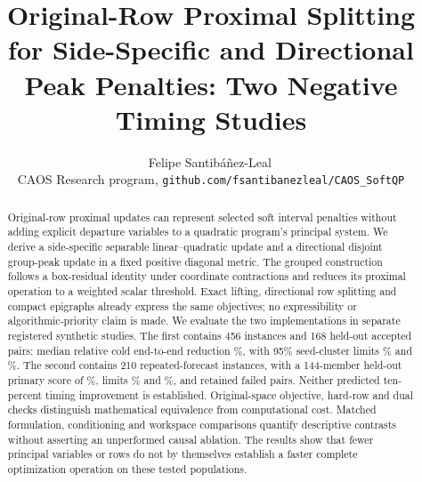 \documentclass[11pt]{article}
\title{Original-Row Proximal Splitting for Side-Specific and Directional Peak Penalties: Two Negative Timing Studies}
\author{Felipe Santib\'a\~nez-Leal\,\orcidlink{0000-0002-0150-3246}\\
\small CAOS Research program, \texttt{github.com/fsantibanezleal/CAOS\_SoftQP}}
\date{\docdate}
\begin{document}
\maketitle
\thispagestyle{plain}
\headerblock
\begin{abstract}
Original-row proximal updates can represent selected soft interval penalties
without adding explicit departure variables to a quadratic program's principal
system. We derive a side-specific separable linear--quadratic update and a
directional disjoint group-peak update in a fixed positive diagonal metric.
The grouped construction follows a box-residual identity under coordinate
contractions and reduces its proximal operation to a weighted scalar threshold.
Exact lifting, directional row splitting and compact epigraphs already express
the same objectives; no expressibility or algorithmic-priority claim is made.
We evaluate the two implementations in separate registered synthetic studies.
The first contains 456 instances and 168 held-out accepted pairs: median
relative cold end-to-end reduction \OriginalEstimate\%, with 95\% seed-cluster
limits \OriginalLower\% and \OriginalUpper\%. The second contains 210
repeated-forecast instances, with a 144-member held-out primary score of
\PrimaryEstimate\%, limits \PrimaryLower\% and \PrimaryUpper\%, and
\PrimaryFailed{} retained failed pairs. Neither predicted ten-percent timing
improvement is established. Original-space objective, hard-row and dual
checks distinguish mathematical equivalence from computational cost. Matched
formulation, conditioning and workspace comparisons quantify descriptive contrasts
without asserting an unperformed causal ablation. The results show that fewer
principal variables or rows do not by themselves establish a faster complete
optimization operation on these tested populations.
\end{abstract}















\end{document}
